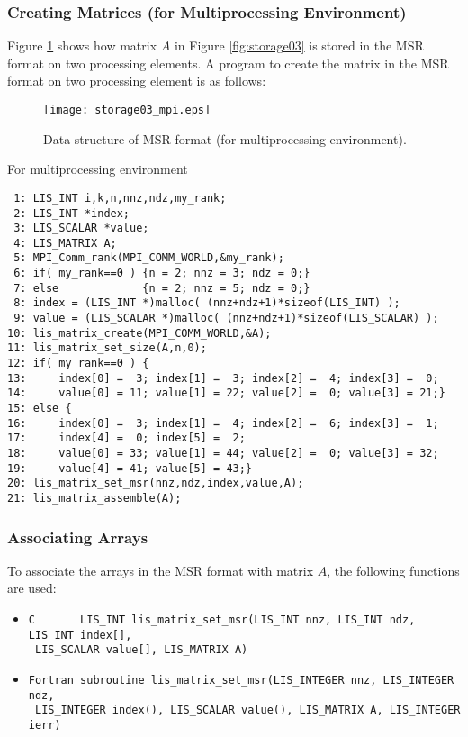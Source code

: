 \documentclass[a4paper]{article}
\begin{document}
\subsubsection{Creating Matrices (for Multiprocessing Environment)}
Figure \ref{fig:storage03_mpi} shows how matrix $A$ in Figure
\ref{fig:storage03} is stored in the MSR format on two processing 
elements. A program to create the matrix in the MSR format on two processing element is as follows:
\begin{figure}[h]
{\centering 
\texttt{[image: storage03\_mpi.eps]} 
\caption{Data structure of MSR format (for multiprocessing environment).}\label{fig:storage03_mpi}}
\end{figure}
\begin{itemsquarebox}[l]{For multiprocessing environment}
\small
\begin{verbatim}
 1: LIS_INT i,k,n,nnz,ndz,my_rank;
 2: LIS_INT *index;
 3: LIS_SCALAR *value;
 4: LIS_MATRIX A;
 5: MPI_Comm_rank(MPI_COMM_WORLD,&my_rank);
 6: if( my_rank==0 ) {n = 2; nnz = 3; ndz = 0;}
 7: else             {n = 2; nnz = 5; ndz = 0;}
 8: index = (LIS_INT *)malloc( (nnz+ndz+1)*sizeof(LIS_INT) );
 9: value = (LIS_SCALAR *)malloc( (nnz+ndz+1)*sizeof(LIS_SCALAR) );
10: lis_matrix_create(MPI_COMM_WORLD,&A);
11: lis_matrix_set_size(A,n,0);
12: if( my_rank==0 ) {
13:     index[0] =  3; index[1] =  3; index[2] =  4; index[3] =  0;
14:     value[0] = 11; value[1] = 22; value[2] =  0; value[3] = 21;}
15: else {
16:     index[0] =  3; index[1] =  4; index[2] =  6; index[3] =  1;
17:     index[4] =  0; index[5] =  2;
18:     value[0] = 33; value[1] = 44; value[2] =  0; value[3] = 32;
19:     value[4] = 41; value[5] = 43;}
20: lis_matrix_set_msr(nnz,ndz,index,value,A);
21: lis_matrix_assemble(A);
\end{verbatim}
\end{itemsquarebox}

\subsubsection{Associating Arrays}
To associate the arrays in the MSR format with matrix $A$, the following functions are used:
\begin{itemize}
\item \verb|C       LIS_INT lis_matrix_set_msr(LIS_INT nnz, LIS_INT ndz, LIS_INT index[],|\\
      \verb| LIS_SCALAR value[], LIS_MATRIX A)|
\item \verb|Fortran subroutine lis_matrix_set_msr(LIS_INTEGER nnz, LIS_INTEGER ndz,|\\
      \verb| LIS_INTEGER index(), LIS_SCALAR value(), LIS_MATRIX A, LIS_INTEGER ierr)|
\end{itemize}
\end{document}
